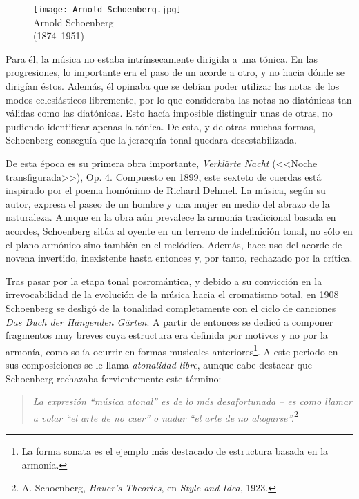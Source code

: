 		\begin{figure}
			\begin{center}
				\texttt{[image: Arnold\_Schoenberg.jpg]}\\
				{Arnold Schoenberg\\(1874--1951)}
			\end{center}
		\end{figure}
		Para \'el, la m\'usica no estaba intr\'insecamente dirigida a una t\'onica. En las progresiones, lo importante era el paso de un acorde a otro, y no hacia d\'onde se dirig\'ian \'estos. Adem\'as, \'el opinaba que se deb\'ian poder utilizar las notas de los modos eclesi\'asticos libremente, por lo que consideraba las notas no diat\'onicas tan v\'alidas como las diat\'onicas. Esto hac\'ia imposible distinguir unas de otras, no pudiendo identificar apenas la t\'onica. De esta, y de otras muchas formas, Schoenberg consegu\'ia que la jerarqu\'ia tonal quedara desestabilizada. \cite{kinney}
		
		De esta \'epoca es su primera obra importante, \emph{Verkl\"arte Nacht} (<<{Noche transfigurada}>>), Op. 4. Compuesto en 1899, este sexteto de cuerdas est\'a inspirado por el poema hom\'onimo de Richard Dehmel. La m\'usica, seg\'un su autor, expresa el paseo de un hombre y una mujer en medio del abrazo de la naturaleza.  Aunque en la obra a\'un prevalece la armon\'ia tradicional basada en acordes, Schoenberg sit\'ua al oyente en un terreno de indefinici\'on tonal, no s\'olo en el plano arm\'onico sino tambi\'en en el mel\'odico. Adem\'as, hace uso del acorde de novena invertido, inexistente hasta entonces y, por tanto, rechazado por la cr\'itica. \cite{diaz}
				
		Tras pasar por la etapa tonal posrom\'antica, y debido a su convicci\'on en la irrevocabilidad de la evoluci\'on de la m\'usica hacia el cromatismo total, en 1908 Schoenberg se deslig\'o de la tonalidad completamente con el ciclo de canciones \emph{Das Buch der H\"angenden G\"arten}. A partir de entonces se dedic\'o a componer fragmentos muy breves cuya estructura era definida por motivos y no por la armon\'ia, como sol\'ia ocurrir en formas musicales anteriores\footnote{La forma sonata es el ejemplo m\'as destacado de estructura basada en la armon\'ia.}. A este periodo en sus composiciones se le llama \emph{atonalidad libre}, aunque cabe destacar que Schoenberg rechazaba fervientemente este t\'ermino:
		
		\begin{quote}
			\emph{La expresi\'on ``m\'usica atonal'' es de lo m\'as desafortunada -- es como llamar a volar ``el arte de no caer'' o nadar ``el arte de no ahogarse''.}\footnote{A. Schoenberg, \emph{Hauer's Theories}, en \emph{Style and Idea}, 1923.}
		\end{quote}
				
